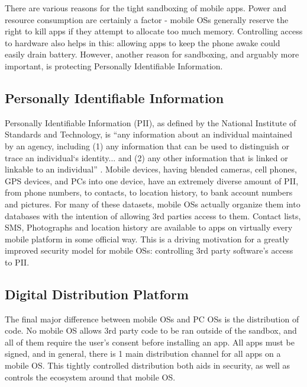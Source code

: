There are various reasons for the tight sandboxing of mobile apps. Power and resource consumption are certainly a factor - mobile OSs generally reserve the right to kill apps if they attempt to allocate too much memory. Controlling access to hardware also helps in this: allowing apps to keep the phone awake could easily drain battery. However, another reason for sandboxing, and arguably more important, is protecting Personally Identifiable Information.

\subsection{Personally Identifiable Information}

Personally Identifiable Information (PII), as defined by the National Institute of Standards and Technology, is ``any information about an individual maintained by an agency, including (1) any information that can be used to distinguish or trace an individual‘s identity... and (2) any other information that is linked or linkable to an individual'' \citep{mccallister2010guide}. Mobile devices, having blended cameras, cell phones, GPS devices, and PCs into one device, have an extremely diverse amount of PII, from phone numbers, to contacts, to location history, to bank account numbers and pictures. For many of these datasets, mobile OSs actually organize them into databases with the intention of allowing 3rd parties access to them. Contact lists, SMS, Photographs and location history are available to apps on virtually every mobile platform in some official way. This is a driving motivation for a greatly improved security model for mobile OSs: controlling 3rd party software's access to PII. 


\subsection{Digital Distribution Platform}

The final major difference between mobile OSs and PC OSs is the distribution of code. No mobile OS allows 3rd party code to be ran outside of the sandbox, and all of them require the user's consent before installing an app. All apps must be signed, and in general, there is 1 main distribution channel for all apps on a mobile OS. This tightly controlled distribution both aids in security, as well as controls the ecosystem around that mobile OS.

